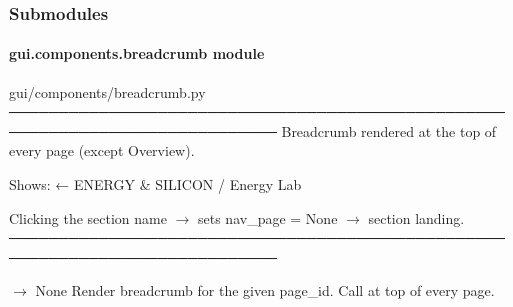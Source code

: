 \documentclass[letterpaper,10pt,english]{sphinxmanual}
\begin{document}
\subsubsection{Submodules}
\label{\detokenize{gui.components:submodules}}
\sphinxstepscope


\paragraph{gui.components.breadcrumb module}
\label{\detokenize{gui.components.breadcrumb:module-gui.components.breadcrumb}}\label{\detokenize{gui.components.breadcrumb:gui-components-breadcrumb-module}}\label{\detokenize{gui.components.breadcrumb::doc}}
\sphinxAtStartPar
gui/components/breadcrumb.py
─────────────────────────────────────────────────────────────────────────────
Breadcrumb rendered at the top of every page (except Overview).

\sphinxAtStartPar
Shows:  ← ENERGY \& SILICON  /  Energy Lab

\sphinxAtStartPar
Clicking the section name \(\rightarrow\) sets nav\_page = None \(\rightarrow\) section landing.
─────────────────────────────────────────────────────────────────────────────

\begin{fulllineitems}
\label{\detokenize{gui.components.breadcrumb:gui.components.breadcrumb.render}}
\pysigstartsignatures
\pysiglinewithargsret
{}
{}
{{ $\rightarrow$ None}}
\pysigstopsignatures
\sphinxAtStartPar
Render breadcrumb for the given page\_id. Call at top of every page.

\end{fulllineitems}


\sphinxstepscope
\end{document}
